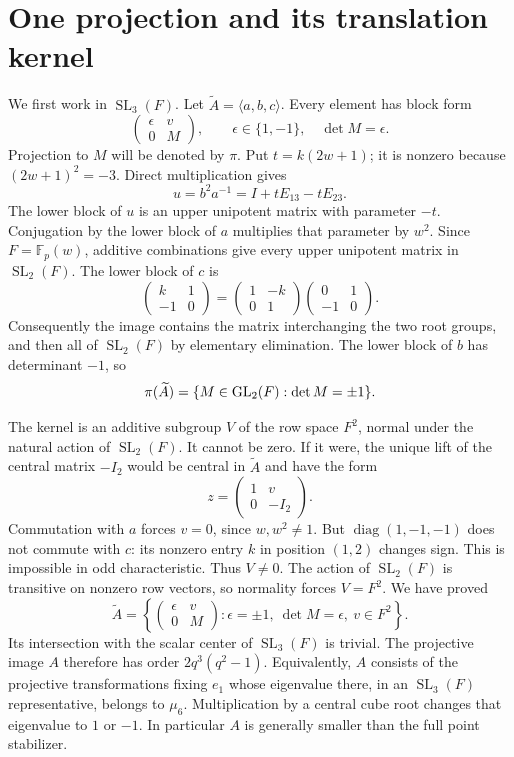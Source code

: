 \documentclass[11pt,a4paper]{article}
\newcommand{\SL}{\operatorname{SL}}\newcommand{\PSL}{\operatorname{PSL}}
\newcommand{\Fp}{\mathbb F_p}\newcommand{\PG}{\operatorname{PG}}
\begin{document}
\section{One projection and its translation kernel}
We first work in $\SL_3(F)$. Let $\widetilde A=\langle a,b,c\rangle$.
Every element has block form
\[
 \begin{pmatrix}\epsilon&v\\0&M\end{pmatrix},\qquad
 \epsilon\in\{1,-1\},\quad \det M=\epsilon.
\]
Projection to $M$ will be denoted by $\pi$. Put $t=k(2w+1)$; it is
nonzero because $(2w+1)^2=-3$. Direct multiplication gives
\[
 u=b^2a^{-1}=I+tE_{13}-tE_{23}.
\]
The lower block of $u$ is an upper unipotent matrix with parameter $-t$.
Conjugation by the lower block of $a$ multiplies that parameter by $w^2$.
Since $F=\Fp(w)$, additive combinations give every upper unipotent
matrix in $\SL_2(F)$. The lower block of $c$ is
\[
 \begin{pmatrix}k&1\\-1&0\end{pmatrix}
 =\begin{pmatrix}1&-k\\0&1\end{pmatrix}
   \begin{pmatrix}0&1\\-1&0\end{pmatrix}.
\]
Consequently the image contains the matrix interchanging the two root
groups, and then all of $\SL_2(F)$ by elementary elimination. The lower
block of $b$ has determinant $-1$, so
\[
                  \pi(\widetilde A)=\{M\in\operatorname{GL}_2(F):\det M=\pm1\}.
\]

The kernel is an additive subgroup $V$ of the row space $F^2$, normal
under the natural action of $\SL_2(F)$. It cannot be zero. If it were,
the unique lift of the central matrix $-I_2$ would be central in
$\widetilde A$ and have the form
\[
                   z=\begin{pmatrix}1&v\\0&-I_2\end{pmatrix}.
\]
Commutation with $a$ forces $v=0$, since $w,w^2\ne1$. But
$\operatorname{diag}(1,-1,-1)$ does not commute with $c$: its nonzero
entry $k$ in position $(1,2)$ changes sign. This is impossible in odd
characteristic. Thus $V\ne0$. The action of $\SL_2(F)$ is transitive
on nonzero row vectors, so normality forces $V=F^2$. We have proved
\begin{equation}\label{eq:A}
 \widetilde A=
 \left\{\begin{pmatrix}\epsilon&v\\0&M\end{pmatrix}:
 \epsilon=\pm1,\ \det M=\epsilon,\ v\in F^2\right\}.
\end{equation}
Its intersection with the scalar center of $\SL_3(F)$ is trivial.
The projective image $A$ therefore has order $2q^3(q^2-1)$.
Equivalently, $A$ consists of the projective transformations fixing
$e_1$ whose eigenvalue there, in an $\SL_3(F)$ representative, belongs
to $\mu_6$. Multiplication by a central cube root changes that
eigenvalue to $1$ or $-1$. In particular $A$ is generally smaller than
the full point stabilizer.
\end{document}

